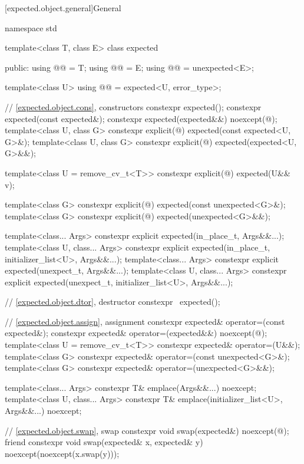 [expected.object.general]{General}

\begin{codeblock}
namespace std {
  template<class T, class E>
  class expected {
  public:
    using @@ = T;
    using @@ = E;
    using @@ = unexpected<E>;

    template<class U>
    using @@ = expected<U, error_type>;

    // \ref{expected.object.cons}, constructors
    constexpr expected();
    constexpr expected(const expected&);
    constexpr expected(expected&&) noexcept(@\seebelow@);
    template<class U, class G>
      constexpr explicit(@\seebelow@) expected(const expected<U, G>&);
    template<class U, class G>
      constexpr explicit(@\seebelow@) expected(expected<U, G>&&);

    template<class U = remove_cv_t<T>>
      constexpr explicit(@\seebelow@) expected(U&& v);

    template<class G>
      constexpr explicit(@\seebelow@) expected(const unexpected<G>&);
    template<class G>
      constexpr explicit(@\seebelow@) expected(unexpected<G>&&);

    template<class... Args>
      constexpr explicit expected(in_place_t, Args&&...);
    template<class U, class... Args>
      constexpr explicit expected(in_place_t, initializer_list<U>, Args&&...);
    template<class... Args>
      constexpr explicit expected(unexpect_t, Args&&...);
    template<class U, class... Args>
      constexpr explicit expected(unexpect_t, initializer_list<U>, Args&&...);

    // \ref{expected.object.dtor}, destructor
    constexpr ~expected();

    // \ref{expected.object.assign}, assignment
    constexpr expected& operator=(const expected&);
    constexpr expected& operator=(expected&&) noexcept(@\seebelow@);
    template<class U = remove_cv_t<T>> constexpr expected& operator=(U&&);
    template<class G>
      constexpr expected& operator=(const unexpected<G>&);
    template<class G>
      constexpr expected& operator=(unexpected<G>&&);

    template<class... Args>
      constexpr T& emplace(Args&&...) noexcept;
    template<class U, class... Args>
      constexpr T& emplace(initializer_list<U>, Args&&...) noexcept;

    // \ref{expected.object.swap}, swap
    constexpr void swap(expected&) noexcept(@\seebelow@);
    friend constexpr void swap(expected& x, expected& y) noexcept(noexcept(x.swap(y)));

}}
\end{codeblock}
